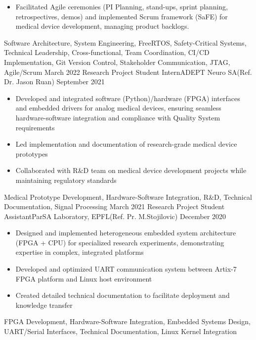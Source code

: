 \begin{experiences}
{\begin{itemize}
                        \item Facilitated Agile ceremonies (PI Planning, stand-ups, sprint planning, retrospectives, demos) and implemented Scrum framework (SaFE) for medical device development, managing product backlogs. 
                      \end{itemize}
                    }
                {Software Architecture, System Engineering, FreeRTOS, Safety-Critical Systems, Technical Leadership, Cross-functional, Team Coordination, CI/CD Implementation, Git Version Control, Stakeholder Communication, JTAG, Agile/Scrum}
  \emptySeparator
  \experience
    {March 2022}   {Research Project Student Intern}{ADEPT Neuro SA}{(Ref. Dr. Jason Ruan)}
    {September 2021} {
                      \begin{itemize}
                        \item Developed and integrated software (Python)/hardware (FPGA) interfaces and embedded drivers for analog medical devices, ensuring seamless hardware-software integration and compliance with Quality System requirements
                        \item Led implementation and documentation of research-grade medical device prototypes
                        \item Collaborated with R\&D team on medical device development projects while maintaining regulatory standards
                      \end{itemize}
                    }
                    {Medical Prototype Development, Hardware-Software Integration, R\&D, Technical Documentation, Signal Processing}
  \emptySeparator
  \experience
    {March 2021}   {Research Project Student Assistant}{ParSA Laboratory, EPFL}{(Ref. Pr. M.Stojilovic)}
    {December 2020} {
                      \begin{itemize}
                        \item Designed and implemented heterogeneous embedded system architecture (FPGA + CPU) for specialized research experiments, demonstrating expertise in complex, integrated platforms
                        \item Developed and optimized UART communication system between Artix-7 FPGA platform and Linux host environment
                        \item Created detailed technical documentation to facilitate deployment and knowledge transfer
                      \end{itemize}
                    }
                    {FPGA Development, Hardware-Software Integration, Embedded Systems Design, UART/Serial Interfaces, Technical Documentation, Linux Kernel Integration}

\end{experiences}
